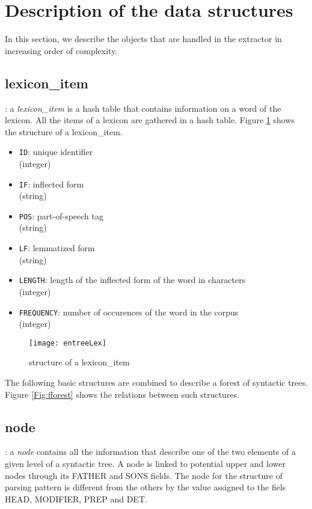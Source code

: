 \section{Description of the data structures}
\label{sec:decr-data-struct}
In this section, we describe the objects that are handled in the
extractor in increasing order of complexity. 

\subsection{lexicon\_item} 
\label{sec:lexentry}
\begin{definition}
: a \emph{lexicon\_item} is a hash table that
contains  information on a word of the lexicon. All the items of a
lexicon are gathered 
in a hash table.  Figure \ref{fig:word} shows the structure of a lexicon\_item. 
\end{definition}

\begin{itemize}
\item \texttt{ID}: unique identifier \\(integer) 
\item \texttt{IF}: inflected form \\(string)
\item \texttt{POS}: part-of-speech tag\\ (string)
\item \texttt{LF}: lemmatized form \\(string)
\item \texttt{LENGTH}: length of the inflected form of the word in characters \\(integer) 
\item \texttt{FREQUENCY}: number of occurences of the word in the corpus \\(integer) 
\end{itemize}

\begin{figure}[!htbp]
  \centering
  \texttt{[image: entreeLex]}
  \caption{structure of a lexicon\_item}
  \label{fig:word}
\end{figure}

The following basic structures are combined to describe a forest of syntactic trees. Figure \ref{Fig:fforest} shows the relations between such structures.

\subsection{node}\label{node}
\begin{definition}[node]
: a \emph{node} contains all the information that
describe one of the two elements of a given level of a syntactic tree. A node is
linked to potential upper and lower nodes through its FATHER and SONS fields. The node for the structure of parsing pattern is different from the others by the value assigned to the fiels HEAD, MODIFIER, PREP and DET. 

\end{definition}


